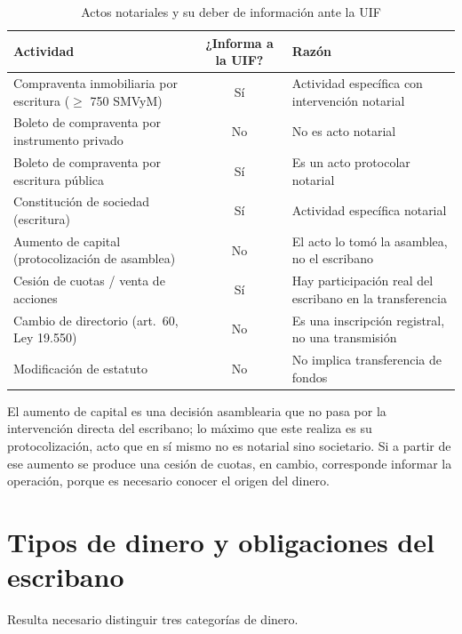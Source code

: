 \documentclass[12pt,oneside]{book}
\begin{document}
\begin{table}[H]
\centering
\caption{Actos notariales y su deber de información ante la UIF}
\renewcommand{\arraystretch}{1.2}
\begin{tabularx}{\textwidth}{>{\raggedright\arraybackslash}Xc>{\raggedright\arraybackslash}X}
\toprule
\textbf{Actividad} & \textbf{¿Informa a la UIF?} & \textbf{Razón} \\
\midrule
Compraventa inmobiliaria por escritura ($\geq$ 750 SMVyM) & Sí & Actividad específica con intervención notarial \\
Boleto de compraventa por instrumento privado & No & No es acto notarial \\
Boleto de compraventa por escritura pública & Sí & Es un acto protocolar notarial \\
Constitución de sociedad (escritura) & Sí & Actividad específica notarial \\
Aumento de capital (protocolización de asamblea) & No & El acto lo tomó la asamblea, no el escribano \\
Cesión de cuotas / venta de acciones & Sí & Hay participación real del escribano en la transferencia \\
Cambio de directorio (art.~60, Ley 19.550) & No & Es una inscripción registral, no una transmisión \\
Modificación de estatuto & No & No implica transferencia de fondos \\
\bottomrule
\end{tabularx}
\end{table}

El aumento de capital es una decisión asamblearia que no pasa por la intervención directa del escribano; lo máximo que este realiza es su protocolización, acto que en sí mismo no es notarial sino societario. Si a partir de ese aumento se produce una cesión de cuotas, en cambio, corresponde informar la operación, porque es necesario conocer el origen del dinero.

\section{Tipos de dinero y obligaciones del escribano}

Resulta necesario distinguir tres categorías de dinero.
\end{document}
